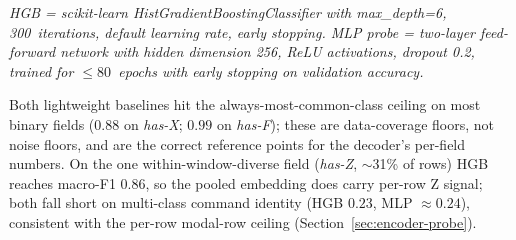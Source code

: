 \documentclass[11pt,a4paper]{article}
\begin{document}
\begin{table}[ht]
\centering
\caption{Non-neural / lightweight baselines on the same mean-pooled encoder embedding the decoder consumes. The decoder's headline numbers appear in Table~\ref{tab:headline}.}
\label{tab:baselines}
\small
{}
\par\smallskip
\textit{HGB = scikit-learn HistGradientBoostingClassifier with max\_depth=6, 300~iterations, default learning rate, early stopping. MLP probe = two-layer feed-forward network with hidden dimension 256, ReLU activations, dropout 0.2, trained for $\le 80$~epochs with early stopping on validation accuracy.}
\end{table}

Both lightweight baselines hit the always-most-common-class ceiling on most binary fields ($0.88$ on \emph{has-X}; $0.99$ on \emph{has-F}); these are data-coverage floors, not noise floors, and are the correct reference points for the decoder's per-field numbers. On the one within-window-diverse field (\emph{has-Z}, $\sim$31\% of rows) HGB reaches macro-F1 $0.86$, so the pooled embedding does carry per-row Z signal; both fall short on multi-class command identity (HGB $0.23$, MLP $\approx0.24$), consistent with the per-row modal-row ceiling (Section~\ref{sec:encoder-probe}).
\end{document}
